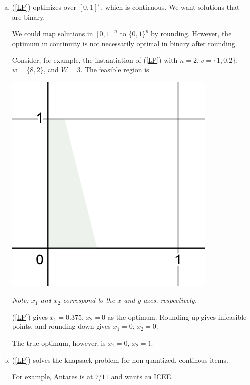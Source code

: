\documentclass[10pt]{article}
\begin{document}
\begin{solution}

\begin{enumerate}[(a)]

    \item {
        (\ref{LP}) optimizes over $[0,1]^n$, which is continuous. 
        We want solutions that are binary. 

        We could map solutions in $[0,1]^n$ to $\{0, 1\}^n$ by 
        rounding. 
        However, the optimum in continuity is not necessarily optimal in binary 
        after rounding. 

        Consider, for example, the instantiation of (\ref{LP}) with 
        $n=2$, $v = \{1, 0.2\}$, $w = \{8, 2\}$, and $W = 3$. 
        The feasible region is:

        \includegraphics[scale=0.5]{1}

        \textit{Note: $x_1$ and $x_2$ correspond to the $x$ and $y$ axes, respectively.} 

        (\ref{LP}) gives $x_1=0.375$, $x_2=0$ as the optimum. 
        Rounding up gives infeasible points, and rounding down gives 
        $x_1=0$, $x_2=0$. 

        The true optimum, however, is $x_1=0$, $x_2=1$. 
    }
    \item {
        (\ref{LP}) solves the knapsack problem for non-quantized, continous 
        items. 

        For example, Antares is at $7/11$ and wants an ICEE. 

}
\end{enumerate}
\end{solution}
\end{document}
